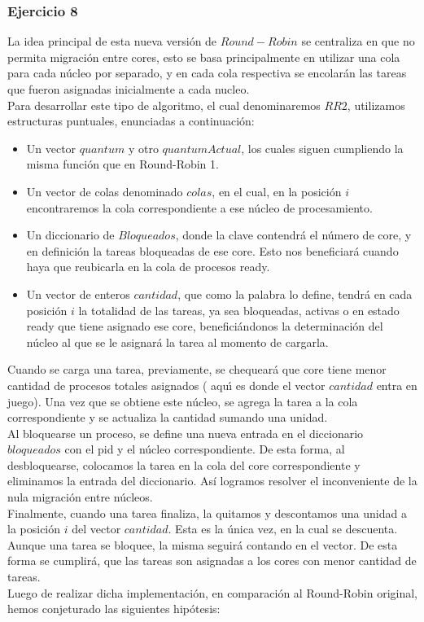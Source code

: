  

\subsubsection[Resolución Ejercicio 8]{Ejercicio 8}

La idea principal de esta nueva versi\'{o}n de $Round-Robin$ se centraliza en que no permita migraci\'{o}n entre
cores, esto se basa principalmente en utilizar una cola para cada núcleo por separado, y en cada
cola respectiva se encolar\'{a}n las tareas que fueron asignadas inicialmente a cada nucleo.\\
Para desarrollar este tipo de algoritmo, el cual denominaremos $RR2$, utilizamos estructuras
puntuales, enunciadas a continuación:\\
\begin{itemize}
 \item Un vector $quantum$ y otro $quantumActual$, los cuales siguen cumpliendo la misma funci\'{o}n que
 en Round-Robin 1.
 \item Un vector de colas denominado $colas$, en el cual, en la posición $i$ encontraremos la cola correspondiente
 a ese núcleo de procesamiento.
 \item Un diccionario de $Bloqueados$, donde la clave contendr\'{a} el número de core, y en definición
 la tareas bloqueadas de ese core. Esto nos beneficiar\'{a} cuando haya que reubicarla en la cola de procesos ready.
 \item Un vector de enteros $cantidad$, que como la palabra lo define, tendrá en cada posición $i$ 
 la totalidad de las tareas, ya sea bloqueadas, activas o en estado ready que tiene asignado ese core, benefici\'{a}ndonos
 la determinación del núcleo al que se le asignará la tarea al momento de cargarla.
\end{itemize}
Cuando se carga una tarea, previamente, se chequeará que core tiene menor cantidad de procesos totales asignados (
aqu\'{\i} es donde el vector $cantidad$ entra en juego). Una vez que se obtiene este n\'{u}cleo, se agrega 
la tarea a la cola correspondiente y se actualiza la cantidad sumando una unidad.\\
\indent Al bloquearse un proceso, se define una nueva entrada en el diccionario $bloqueados$ con el
pid y el n\'{u}cleo correspondiente. De esta forma, al desbloquearse, colocamos la tarea en la cola del core
correspondiente y eliminamos la entrada del diccionario. Así logramos resolver el inconveniente de la nula
migración entre n\'{u}cleos.\\
\indent Finalmente, cuando una tarea finaliza, la quitamos y descontamos una unidad a la posición $i$ del vector
$cantidad$. Esta es la única vez, en la cual se descuenta. Aunque una tarea se bloquee, la misma
seguirá contando en el vector. De esta forma se cumplirá, que las tareas son asignadas a los cores
con menor cantidad de tareas.\\
Luego de realizar dicha implementación, en comparación al Round-Robin original, hemos conjeturado 
las siguientes hipótesis:

